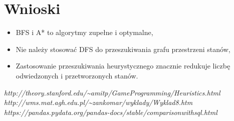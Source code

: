 \documentclass{classrep}
\begin{document}
\section{Wnioski}
\begin{itemize}
  \item BFS i A* to algorytmy zupełne i optymalne,
  \item Nie należy stosować DFS do przeszukiwania grafu przestrzeni stanów,
  \item Zastosowanie przeszukiwania heurystycznego znacznie redukuje liczbę odwiedzonych i przetworzonych
    stanów.
\end{itemize}

\begin{thebibliography}{0}
  \textsl{http://theory.stanford.edu/\textasciitilde{}amitp/GameProgramming/Heuristics.html}
  \textsl{http://wms.mat.agh.edu.pl/\textasciitilde{}zankomar/wyklady/Wyklad8.htm}
  \textsl{https://pandas.pydata.org/pandas-docs/stable/comparison\textunderscore{}with\textunderscore{}sql.html}
\end{thebibliography}
\end{document}
